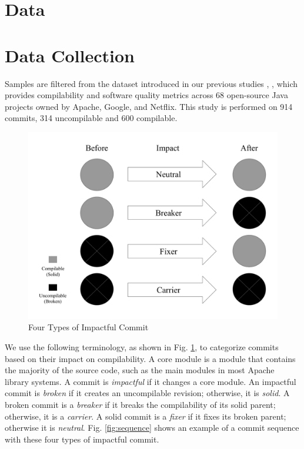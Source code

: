 \section{Data}
\label{sec:data}
\section{Data Collection}
\label{sec:data-collection}

Samples are filtered from the dataset introduced in our previous studies \cite{pooyan_esem}, \cite{pooyan_qrs}, which provides compilability and software quality metrics across 68 open-source Java projects owned by Apache, Google, and Netflix. 
This study is performed on 914 commits, 314 uncompilable and 600 compilable.

\begin{figure}[htbp]
    \centerline{\includegraphics[scale=0.3]{figures/terminology.pdf}}
    \caption{Four Types of Impactful Commit}
    \label{fig:terminology}
    \end{figure}

We use the following terminology, as shown in Fig. \ref{fig:terminology}, to categorize commits based on their impact on compilability. 
A core module is a module that contains the majority of the source code, such as the main modules in most Apache library systems.
A commit is \textit{impactful} if it changes a core module.
An impactful commit is \textit{broken} if it creates an uncompilable revision; otherwise, it is \textit{solid}.
A broken commit is a \textit{breaker} if it breaks the compilability of its solid parent; otherwise, it is a \textit{carrier}.
A solid commit is a \textit{fixer} if it fixes its broken parent; otherwise it is \textit{neutral}.
Fig. \ref{fig:sequence} shows an example of a commit sequence with these four types of impactful commit.

